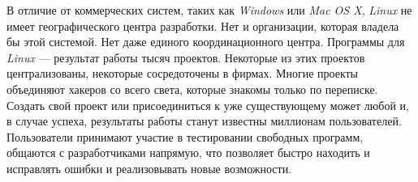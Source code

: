 В отличие от коммерческих систем, таких как \textit{Windows} или \textit{Mac OS X}, \textit{Linux} не имеет географического центра разработки. Нет и организации, которая владела бы этой системой. Нет даже единого координационного центра. Программы для \textit{Linux} — результат работы тысяч проектов. Некоторые из этих проектов централизованы, некоторые сосредоточены в фирмах. Многие проекты объединяют хакеров со всего света, которые знакомы только по переписке. Создать свой проект или присоединиться к уже существующему может любой и, в случае успеха, результаты работы станут известны миллионам пользователей. Пользователи принимают участие в тестировании свободных программ, общаются с разработчиками напрямую, что позволяет быстро находить и исправлять ошибки и реализовывать новые возможности.